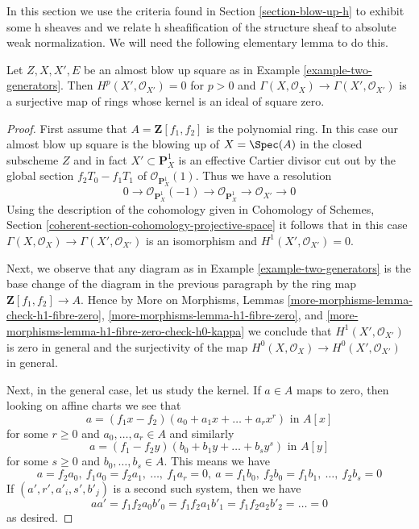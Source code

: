 \noindent
In this section we use the criteria found in
Section \ref{section-blow-up-h}
to exhibit some h sheaves and we relate h sheafification
of the structure sheaf to absolute weak normalization.
We will need the following elementary lemma to do this.

\begin{lemma}
\label{lemma-funny-blow-up}
Let $Z, X, X', E$ be an almost blow up square as in
Example \ref{example-two-generators}.
Then $H^p(X', \mathcal{O}_{X'}) = 0$ for $p > 0$ and
$\Gamma(X, \mathcal{O}_X) \to \Gamma(X', \mathcal{O}_{X'})$
is a surjective map of rings whose kernel is an ideal of square zero.
\end{lemma}

\begin{proof}
First assume that $A = \mathbf{Z}[f_1, f_2]$ is the polynomial ring.
In this case our almost blow up square is the blowing up of $X = \Spec(A)$
in the closed subscheme $Z$ and in fact $X' \subset \mathbf{P}^1_X$
is an effective Cartier divisor cut out by the global section
$f_2T_0 - f_1 T_1$ of $\mathcal{O}_{\mathbf{P}^1_X}(1)$.
Thus we have a resolution
$$
0 \to
\mathcal{O}_{\mathbf{P}^1_X}(-1) \to
\mathcal{O}_{\mathbf{P}^1_X} \to
\mathcal{O}_{X'} \to
0
$$
Using the description of the cohomology given in
Cohomology of Schemes, Section
\ref{coherent-section-cohomology-projective-space}
it follows that in this case
$\Gamma(X, \mathcal{O}_X) \to \Gamma(X', \mathcal{O}_{X'})$
is an isomorphism and $H^1(X', \mathcal{O}_{X'}) = 0$.

\medskip\noindent
Next, we observe that any diagram as in Example \ref{example-two-generators}
is the base change of the diagram in the previous paragraph by the
ring map $\mathbf{Z}[f_1, f_2] \to A$. Hence by More on Morphisms, Lemmas
\ref{more-morphisms-lemma-check-h1-fibre-zero},
\ref{more-morphisms-lemma-h1-fibre-zero}, and
\ref{more-morphisms-lemma-h1-fibre-zero-check-h0-kappa}
we conclude that $H^1(X', \mathcal{O}_{X'})$ is zero in general
and the surjectivity of the map
$H^0(X, \mathcal{O}_X) \to H^0(X', \mathcal{O}_{X'})$ in general.

\medskip\noindent
Next, in the general case, let us study the kernel. If
$a \in A$ maps to zero, then looking on affine charts
we see that
$$
a = (f_1x - f_2)(a_0 + a_1x + \ldots + a_rx^r)\text{ in }A[x]
$$
for some $r \geq 0$ and $a_0, \ldots, a_r \in A$ and similarly
$$
a = (f_1 - f_2y)(b_0 + b_1y + \ldots + b_s y^s)\text{ in }A[y]
$$
for some $s \geq 0$ and $b_0, \ldots, b_s \in A$. This means we
have
$$
a = f_2 a_0,\ f_1 a_0 = f_2 a_1,\ \ldots,\ f_1 a_r = 0,
\ a = f_1 b_0,\ f_2 b_0 = f_1 b_1,\ \ldots,\ f_2 b_s = 0
$$
If $(a', r', a'_i, s', b'_j)$ is a second such system, then we have
$$
aa' = f_1f_2a_0b'_0 = f_1f_2a_1b'_1 = f_1f_2a_2b'_2 = \ldots = 0
$$
as desired.
\end{proof}

